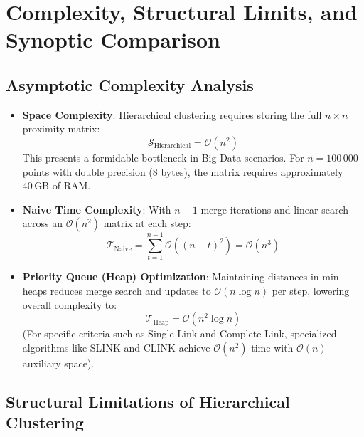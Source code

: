 \section{Complexity, Structural Limits, and Synoptic Comparison}
\label{sec:dm-hierarchical-complexity-comparison}

\subsection{Asymptotic Complexity Analysis}

\begin{itemize}
    \item \textbf{Space Complexity}: Hierarchical clustering requires storing the full $n \times n$ proximity matrix:
    \begin{equation}
        \mathcal{S}_{\text{Hierarchical}} = \mathcal{O}(n^2)
    \end{equation}
    This presents a formidable bottleneck in Big Data scenarios. For $n = 100\,000$ points with double precision (8 bytes), the matrix requires approximately $40\,\text{GB}$ of RAM.
    \item \textbf{Naive Time Complexity}: With $n - 1$ merge iterations and linear search across an $\mathcal{O}(n^2)$ matrix at each step:
    \begin{equation}
        \mathcal{T}_{\text{Naive}} = \sum_{t=1}^{n-1} \mathcal{O}((n - t)^2) = \mathcal{O}(n^3)
    \end{equation}
    \item \textbf{Priority Queue (Heap) Optimization}: Maintaining distances in min-heaps reduces merge search and updates to $\mathcal{O}(n \log n)$ per step, lowering overall complexity to:
    \begin{equation}
        \mathcal{T}_{\text{Heap}} = \mathcal{O}(n^2 \log n)
    \end{equation}
    (For specific criteria such as Single Link and Complete Link, specialized algorithms like SLINK and CLINK achieve $\mathcal{O}(n^2)$ time with $\mathcal{O}(n)$ auxiliary space).
\end{itemize}

\subsection{Structural Limitations of Hierarchical Clustering}


